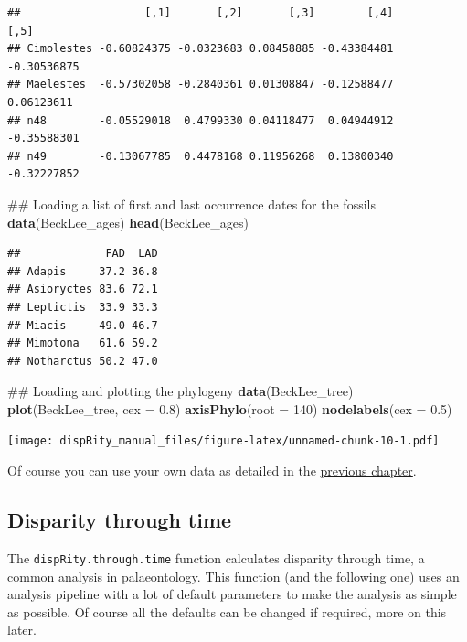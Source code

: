 \documentclass[]{book}
\newenvironment{Shaded}{\begin{snugshade}}{\end{snugshade}}
\newcommand{\KeywordTok}[1]{\textcolor[rgb]{0.13,0.29,0.53}{\textbf{#1}}}
\newcommand{\DataTypeTok}[1]{\textcolor[rgb]{0.13,0.29,0.53}{#1}}
\newcommand{\DecValTok}[1]{\textcolor[rgb]{0.00,0.00,0.81}{#1}}
\newcommand{\FloatTok}[1]{\textcolor[rgb]{0.00,0.00,0.81}{#1}}
\newcommand{\NormalTok}[1]{#1}
\theoremstyle{definition}
\theoremstyle{definition}
\theoremstyle{remark}
\begin{document}
\begin{verbatim}
##                   [,1]       [,2]       [,3]        [,4]        [,5]
## Cimolestes -0.60824375 -0.0323683 0.08458885 -0.43384481 -0.30536875
## Maelestes  -0.57302058 -0.2840361 0.01308847 -0.12588477  0.06123611
## n48        -0.05529018  0.4799330 0.04118477  0.04944912 -0.35588301
## n49        -0.13067785  0.4478168 0.11956268  0.13800340 -0.32227852
\end{verbatim}

\begin{Shaded}
\begin{Highlighting}[]
\NormalTok{## Loading a list of first and last occurrence dates for the fossils}
\KeywordTok{data}\NormalTok{(BeckLee_ages)}
\KeywordTok{head}\NormalTok{(BeckLee_ages)}
\end{Highlighting}
\end{Shaded}

\begin{verbatim}
##             FAD  LAD
## Adapis     37.2 36.8
## Asioryctes 83.6 72.1
## Leptictis  33.9 33.3
## Miacis     49.0 46.7
## Mimotona   61.6 59.2
## Notharctus 50.2 47.0
\end{verbatim}

\begin{Shaded}
\begin{Highlighting}[]
\NormalTok{## Loading and plotting the phylogeny}
\KeywordTok{data}\NormalTok{(BeckLee_tree)}
\KeywordTok{plot}\NormalTok{(BeckLee_tree, }\DataTypeTok{cex =} \FloatTok{0.8}\NormalTok{) }
\KeywordTok{axisPhylo}\NormalTok{(}\DataTypeTok{root =} \DecValTok{140}\NormalTok{)}
\KeywordTok{nodelabels}\NormalTok{(}\DataTypeTok{cex =} \FloatTok{0.5}\NormalTok{)}
\end{Highlighting}
\end{Shaded}

\texttt{[image: dispRity\_manual\_files/figure-latex/unnamed-chunk-10-1.pdf]}

Of course you can use your own data as detailed in the
\protect\hyperlink{What-sort-of-data-does-dispRity-work-with}{previous
chapter}.

\subsection{Disparity through time}\label{disparity-through-time}

The \texttt{dispRity.through.time} function calculates disparity through
time, a common analysis in palaeontology. This function (and the
following one) uses an analysis pipeline with a lot of default
parameters to make the analysis as simple as possible. Of course all the
defaults can be changed if required, more on this later.
\end{document}
